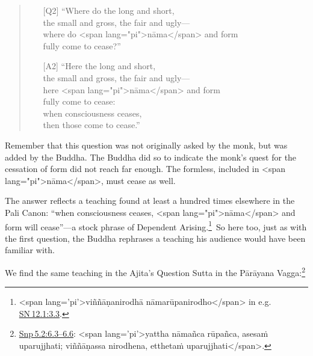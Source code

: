\documentclass[10pt, openright]{book}
\begin{document}
\begin{quote}


\begin{itemize}

\item[{[Q2]}]“Where do the long and short, \\ the small and gross, the fair and ugly— \\ where do <span lang="pi">nāma</span> and form \\ fully come to cease?”


\item[{[A2]}]“Here the long and short, \\ the small and gross, the fair and ugly— \\ here <span lang="pi">nāma</span> and form \\ fully come to cease: \\ when consciousness ceases, \\ then those come to cease.”

\end{itemize}

\end{quote}
Remember that this question was not originally asked by the monk, but was added by the Buddha. The Buddha did so to indicate the monk’s quest for the cessation of form did not reach far enough. The formless, included in <span lang="pi">nāma</span>, must cease as well.


The answer reflects a teaching found at least a hundred times elsewhere in the Pali Canon: “when consciousness ceases, <span lang="pi">nāma</span> and form will cease”—a stock phrase of Dependent Arising.\footnote {<span lang='pi'>viññāṇanirodhā nāmarūpanirodho</span> in e.g. \href{https://suttacentral.net/sn12.1/en/sujato\#3.3}{SN 12.1:3.3}.} So here too, just as with the first question, the Buddha rephrases a teaching his audience would have been familiar with.


We find the same teaching in the Ajita’s Question Sutta in the Pārāyana Vagga:\footnote {\href{https://suttacentral.net/snp5.2/en/sujato\#6.3}{Snp 5.2:6.3–6.6}: <span lang='pi'>yattha nāmañca rūpañca, asesaṁ uparujjhati; viññāṇassa nirodhena, etthetaṁ uparujjhati</span>.}
\end{document}
